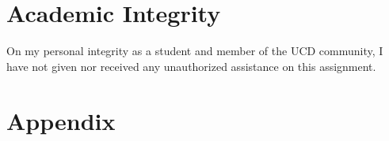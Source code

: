 \documentclass[a4paper,12pt]{article}
\begin{document}
\section{Academic Integrity}
On my personal integrity as a student and member of the UCD community, I have not given nor received any unauthorized assistance on this assignment.


\section{Appendix}


\end{document}
